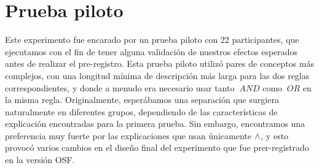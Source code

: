 \section{Prueba piloto} \label{subsection:resultsPilot}

Este experimento fue encarado por un prueba piloto con 22 participantes, que ejecutamos con el fin de tener alguna validación de nuestros efectos esperados antes de realizar el pre-registro. Esta prueba piloto utilizó pares de conceptos más complejos, con una longitud mínima de descripción más larga para las dos reglas correspondientes, y donde a menudo era necesario usar tanto $\ AND $ como $\ OR $ en la misma regla. Originalmente, esperábamos una separación que surgiera naturalmente en diferentes grupos, dependiendo de las características de explicación encontradas para la primera prueba. Sin embargo, encontramos una preferencia muy fuerte por las explicaciones que usan únicamente $ \land $, y esto provocó varios cambios en el diseño final del experimento que fue prer-registrado en la versión OSF.

